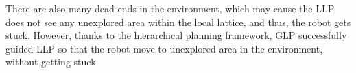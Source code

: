 \documentclass[letterpaper]{article} %
\begin{document}
There are also many dead-ends in the environment, which may cause the LLP does not see any unexplored area within the local lattice, and thus, the robot gets stuck.
However, thanks to the hierarchical planning framework, GLP successfully guided LLP so that the robot move to unexplored area in the environment, without getting stuck.

\begin{figure}[t!]
  \centering
  \\
  \\
\end{figure}
\end{document}
